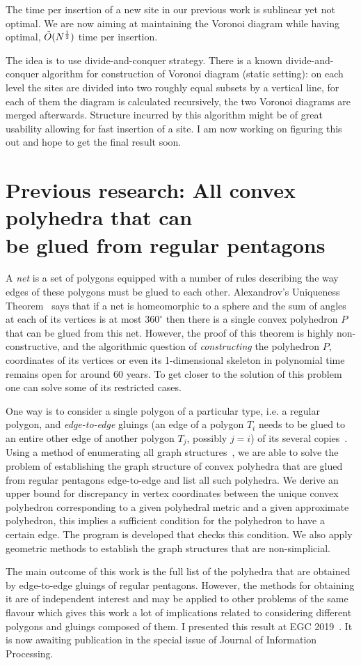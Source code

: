 \documentclass[a4paper,11pt]{article}
\def\vsection#1{\vspace{-4.5mm}\section{#1}\vspace{-3.5mm}}
\theoremstyle{definition}
\begin{document}
The time per insertion of a new site in our previous work is sublinear yet not optimal. We are now aiming at maintaining the Voronoi diagram while having optimal, $\tilde O(N^{\frac12})$ time per insertion.

The idea is to use divide-and-conquer strategy. There is a known divide-and-conquer algorithm  for construction of Voronoi diagram (static setting): on each level the sites are divided into two roughly equal subsets by a vertical line, for each of them the diagram is calculated recursively, the two Voronoi diagrams are merged afterwards. Structure incurred by this algorithm might be of great usability allowing for fast insertion of a site. I am now working on figuring this out and hope to get the final result soon.

\vsection{Previous research: All convex polyhedra that can\\
	be glued from regular pentagons}

A \emph{net} is a set of polygons equipped with a number of rules describing the way edges of these polygons must be glued to each other. Alexandrov's Uniqueness Theorem~\cite{alex} says that if a net is homeomorphic to a sphere and the sum of angles at each of its vertices is at most $360^\circ$ then there is a single convex polyhedron $P$ that can be glued from this net. However, the proof of this theorem is highly non-constructive, and the algorithmic question of {\it constructing} the polyhedron $P$, coordinates of its vertices or even its 1-dimensional skeleton in polynomial time remains open for around 60 years. To get closer to the solution of this problem one can solve some of its restricted cases.

One way is to consider a single polygon of a particular type, i.e. a regular polygon, and {\it edge-to-edge} gluings (an edge of a polygon $T_i$ needs to be glued to an entire other edge of another polygon $T_j$, possibly $j=i$) of its several copies~\cite{gfalop}. Using a method of enumerating all graph structures~\cite{kl17-hex}, we are able to solve the problem of establishing the graph structure of convex polyhedra that are glued from regular pentagons edge-to-edge and list all such polyhedra. We derive an upper bound for discrepancy in vertex coordinates between the unique convex polyhedron corresponding to a given polyhedral metric and a given approximate polyhedron, this implies a sufficient condition for the polyhedron to have a certain edge. The program is developed that checks this condition. We also apply geometric methods to establish the graph structures that are non-simplicial.

The main outcome of this work is the full list of the polyhedra that are obtained by edge-to-edge gluings of regular pentagons. However, the methods for obtaining it are of independent interest and may be applied to other problems of the same flavour which gives this work a lot of implications related to considering different polygons and gluings composed of them. I presented this result at EGC 2019~\cite{egc-penta}. It is now awaiting publication in the special issue of Journal of Information Processing.



\end{document}
